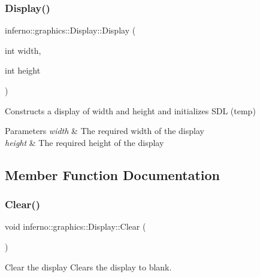 \subsubsection{\texorpdfstring{Display()}{Display()}}
{\footnotesize\ttfamily inferno\+::graphics\+::\+Display\+::\+Display (\begin{DoxyParamCaption}\item[{int}]{width,  }\item[{int}]{height }\end{DoxyParamCaption})\hspace{0.3cm}{\ttfamily [inline]}}



Constructs a display of width and height and initializes S\+DL (temp) 


\begin{DoxyParams}{Parameters}
{\em width} & The required width of the display \\
\hline
{\em height} & The required height of the display \\
\hline
\end{DoxyParams}


\subsection{Member Function Documentation}
\mbox{\label{classinferno_1_1graphics_1_1_display_aabd8a093188d59ac2399abd66e5f00d8}} 
\subsubsection{\texorpdfstring{Clear()}{Clear()}}
{\footnotesize\ttfamily void inferno\+::graphics\+::\+Display\+::\+Clear (\begin{DoxyParamCaption}{ }\end{DoxyParamCaption})\hspace{0.3cm}{\ttfamily [inline]}}



Clear the display Clears the display to blank. 

\mbox{\label{classinferno_1_1graphics_1_1_display_a6b2bd638d5f6b07b4a5cfad4a04fab41}} 
